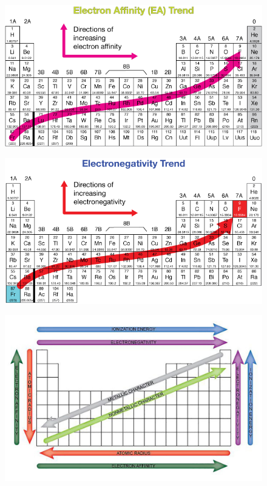 \documentclass{article}
\begin{document}
\begin{figure}[H]
    \centering
    \includegraphics[width=1\textwidth]{ElectronAffinityTrend.png}
    \end{figure}

\begin{figure}[H]
    \centering
    \includegraphics[width=1\textwidth]{qauzvgRRrWMhrcf1oYAA_ElectronegativityTrendFigure.png}
    \end{figure}


\begin{figure}[H]
    \centering
    \includegraphics[width=1\textwidth]{ELECTRONEGAjfjksdgfjg.jpg}
    \end{figure}

   \newpage
   
   


\end{document}
